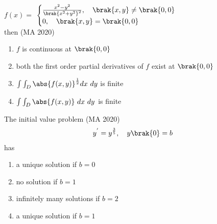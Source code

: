 $f(x)=$
$ \begin{cases}
   \frac{x^2-y^2}{\brak{x^2+y^2}^2},\quad \brak{x,y} \neq \brak{0,0}\\
   0, \quad \brak{x,y} = \brak{0,0}
\end{cases} $ \\
then
\hfill{(MA 2020)}

\begin{enumerate}
\item $f$ is continuous at $\brak{0,0}$
\item both the first order partial derivatives of $f$ exist at $\brak{0,0}$ 
\item $\int \int_D \abs{f(x,y)}^{\frac{1}{2}}dx \text{ } dy$ is finite
\item $\int \int_D \abs{f(x,y)}\text{ }dx \text{ } dy$ is finite
\end{enumerate}


\item The initial value problem
\hfill{(MA 2020)}
\begin{align}
y^{'}=y^{\frac{3}{5}}, \quad y\brak{0}=b
\end{align}
has

\begin{enumerate}
\item a unique solution if $b=0$
\item no solution if $b=1$
\item infinitely many solutions if $b=2$
\item a unique solution if $b=1$
\end{enumerate}


